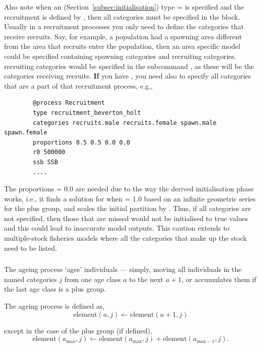 Also note when an  (Section~\ref{subsec:initialisation}) type =  is specified and the recruitment is defined by , then all categories must be specified in the  block. Usually in a recruitment processes you only need to define the categories that receive recruits. Say, for example, a population had a spawning area different from the area that recruits enter the population, then an area specific model could be specified containing spawning categories and recruiting categories. recruiting categories would be specified in the subcommand , as these will be the categories receiving recruits. \textbf{If} you have ,  you need also to specify all categories that are a part of that recruitment process, e.g.,

{\small{\begin{verbatim}
		@process Recruitment
		type recruitment_beverton_holt
		categories recruits.male recruits.female spawn.male spawn.female
		proportions 0.5 0.5 0.0 0.0
		r0 500000
		ssb SSB
		....
		\end{verbatim}}}
The proportions = 0.0 are needed due to the way the derived initialisation phase works, i.e., it finds a solution for when  = 1.0 based on an infinite geometric series for the plus group, and scales the initial partition by . Thus, if all categories are not specified, then those that are missed would not be initialised to true values and this could lead to inaccurate model outputs. This caution extends to multiple-stock fisheries models where all the categories that make up the stock need to be listed.
\subsubsection{\label{sec:ageing}}

The ageing process `ages' individuals --- simply, moving all individuals in the named categories $j$ from one age class $a$ to the next $a + 1$, or accumulates them if the last age class is a plus group. 

The ageing process is defined as,
\begin{equation}
  \text{element}(a,j) \leftarrow \text{element}(a + 1,j)
\end{equation}

except in the case of the plus group (if defined), 
\begin{equation}
  \text{element}(a_{\text{max}}, j) \leftarrow \text{element}(a_{\text{max}}, j) + \text{element}(a_{\text{max}-1}, j).
\end{equation}


